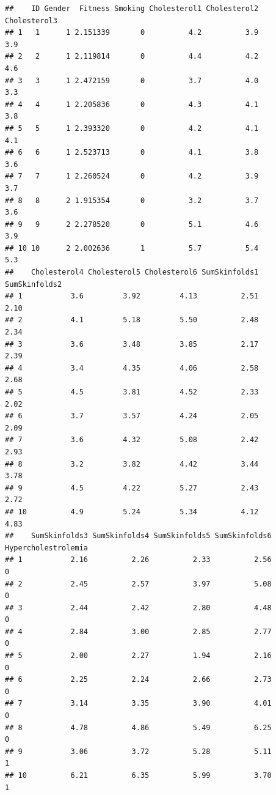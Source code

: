 \documentclass[
]{book}
\begin{document}
\begin{verbatim}
##    ID Gender  Fitness Smoking Cholesterol1 Cholesterol2 Cholesterol3
## 1   1      1 2.151339       0          4.2          3.9          3.9
## 2   2      1 2.119814       0          4.4          4.2          4.6
## 3   3      1 2.472159       0          3.7          4.0          3.3
## 4   4      1 2.205836       0          4.3          4.1          3.8
## 5   5      1 2.393320       0          4.2          4.1          4.1
## 6   6      1 2.523713       0          4.1          3.8          3.6
## 7   7      1 2.260524       0          4.2          3.9          3.7
## 8   8      2 1.915354       0          3.2          3.7          3.6
## 9   9      2 2.278520       0          5.1          4.6          3.9
## 10 10      2 2.002636       1          5.7          5.4          5.3
##    Cholesterol4 Cholesterol5 Cholesterol6 SumSkinfolds1 SumSkinfolds2
## 1           3.6         3.92         4.13          2.51          2.10
## 2           4.1         5.18         5.50          2.48          2.34
## 3           3.6         3.48         3.85          2.17          2.39
## 4           3.4         4.35         4.06          2.58          2.68
## 5           4.5         3.81         4.52          2.33          2.02
## 6           3.7         3.57         4.24          2.05          2.09
## 7           3.6         4.32         5.08          2.42          2.93
## 8           3.2         3.82         4.42          3.44          3.78
## 9           4.5         4.22         5.27          2.43          2.72
## 10          4.9         5.24         5.34          4.12          4.83
##    SumSkinfolds3 SumSkinfolds4 SumSkinfolds5 SumSkinfolds6 Hypercholestrolemia
## 1           2.16          2.26          2.33          2.56                   0
## 2           2.45          2.57          3.97          5.08                   0
## 3           2.44          2.42          2.80          4.48                   0
## 4           2.84          3.00          2.85          2.77                   0
## 5           2.00          2.27          1.94          2.16                   0
## 6           2.25          2.24          2.66          2.73                   0
## 7           3.14          3.35          3.90          4.01                   0
## 8           4.78          4.86          5.49          6.25                   0
## 9           3.06          3.72          5.28          5.11                   1
## 10          6.21          6.35          5.99          3.70                   1
\end{verbatim}
\end{document}

